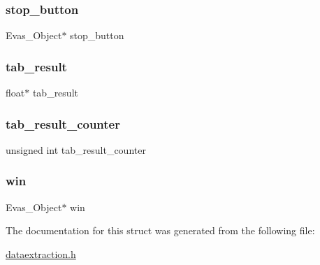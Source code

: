 \subsubsection{\texorpdfstring{stop\+\_\+button}{stop\_button}}
{\footnotesize\ttfamily Evas\+\_\+\+Object$\ast$ stop\+\_\+button}

\mbox{\label{structappdata_a0fabaff8dc45fd6a24f7d371f11a3c6b}} 
\subsubsection{\texorpdfstring{tab\+\_\+result}{tab\_result}}
{\footnotesize\ttfamily float$\ast$ tab\+\_\+result}

\mbox{\label{structappdata_aa91889b8d2b34d5f2e55fa5b0b570b28}} 
\subsubsection{\texorpdfstring{tab\+\_\+result\+\_\+counter}{tab\_result\_counter}}
{\footnotesize\ttfamily unsigned int tab\+\_\+result\+\_\+counter}

\mbox{\label{structappdata_a588367fdb1ab298a0018bea36186a29a}} 
\subsubsection{\texorpdfstring{win}{win}}
{\footnotesize\ttfamily Evas\+\_\+\+Object$\ast$ win}



The documentation for this struct was generated from the following file\+:\begin{DoxyCompactItemize}
\item 
\hyperlink{dataextraction_8h}{dataextraction.\+h}\end{DoxyCompactItemize}
